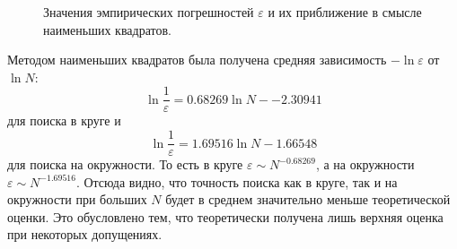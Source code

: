 \documentclass[12pt, a4paper]{article}
\begin{document}
\begin{figure}[H]
\caption{Значения эмпирических погрешностей $\varepsilon$ и их приближение в смысле наименьших квадратов.}
\end{figure}

Методом наименьших квадратов была получена средняя зависимость $-\ln\varepsilon$ от $\ln N$:
\[ \ln{\frac 1\varepsilon} = 0.68269\ln N - -2.30941 \]
для поиска в круге и 
\[ \ln{\frac 1\varepsilon} = 1.69516\ln N - 1.66548 \]
для поиска на окружности. То есть в круге $\varepsilon \sim N^{-0.68269}$, а на окружности $\varepsilon \sim N^{-1.69516}$. Отсюда видно, что точность поиска как в круге, так и на окружности при больших $N$ будет в среднем значительно меньше теоретической оценки. Это обусловлено тем, что теоретически получена лишь верхняя оценка при некоторых допущениях.



\end{document}
